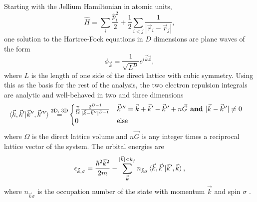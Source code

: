 \documentclass{revtex4}
\begin{document}
	Starting with the Jellium Hamiltonian in atomic units, 
	\begin{equation}\label{hamiltonian}
		\hat{H} = \sum_i \frac{\hat{p}_i^2}{2}  + \frac{1}{2} \sum_{i < j} \frac{1}{|\vec{r}_i - 
		\vec{r}_j|},
	\end{equation}
	one solution to the Hartree-Fock equations in $D$ dimensions are plane waves of the form	
	\begin{equation}\label{planewave}
		\phi_{\vec{k}} =
		   \frac{1} { \sqrt{L ^ D} } e ^ {i \vec{k} \dot \vec{x}},
	\end{equation}
	where $L$ is the length of one side of the direct lattice with cubic symmetry. Using this as the 
	basis for the rest of the analysis, the two electron repulsion integrals are analytic and 
	well-behaved in two and three dimensions \cite{Delyon2008}\cite{Guiliani2005}
  \begin{align}
   	\braket{\vec{k}, \vec{k}' | \vec{k}'', \vec{k}'''} 
  	  \stackrel{ \text{2D, 3D} }{=}&
   	\begin{cases} 
   	\frac{\pi} {\Omega} \frac{ 2^{D-1} } { | \vec{k} - \vec{k}'' | ^ {D-1} } 
   	& \vec{k}''' = \vec{k} + \vec{k}' - \vec{k}'' + n\vec{G} \textbf{ and } | \vec{k} - 
   	\vec{k}''| \neq 0 \\
   	0 
   	& \text{else}
   	\end{cases}
  \end{align}
  where $\Omega$ is the direct lattice volume and $n\vec{G}$ is any integer times a reciprocal 
  lattice vector of the 
  system. The orbital energies are
  \begin{equation}\label{eq:hf_orb_energy}
  \epsilon_{\vec{k},\sigma}=
  \frac{\hbar^2\vec{k}^2}{2m} - \sum\limits_{\vec{k}}^{|\vec{k}|< 
  k_f}n_{\vec{k}\sigma}\braket{\vec{k}, \vec{k}' |\vec{k}', \vec{k}},
  \end{equation}
  where $n_{\vec{k}\sigma}$ is the occupation number of the state with momentum $\vec{k}$ and 
  spin $\sigma$ \cite{Guiliani2005}. 
    
\end{document}
